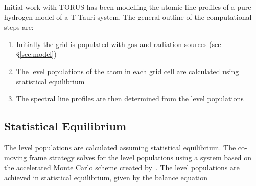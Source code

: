 \documentclass[fleqn,usenatbib]{mnras}
\begin{document}
Initial work with TORUS has been modelling the atomic line profiles of a pure hydrogen model of a T Tauri system. The general outline of the computational steps are:
\begin{enumerate}
    \item Initially the grid is populated with gas and radiation sources (see \S\ref{sec:model})
    \item The level populations of the atom in each grid cell are calculated using statistical equilibrium 
    \item The spectral line profiles are then determined from the level populations
\end{enumerate}


\subsection{Statistical Equilibrium}
\label{sec:statistical}

The level populations are calculated assuming statistical equilibrium. The co-moving frame strategy solves for the level populations using a system based on the accelerated Monte Carlo scheme created by~\citet{Hogerheijde:2000wb}. The level populations are achieved in statistical equilibrium, given by the balance equation
\end{document}
